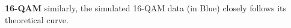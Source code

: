 \textbf{16-QAM} similarly, the simulated 16-QAM data (in Blue) closely follows its theoretical curve.

